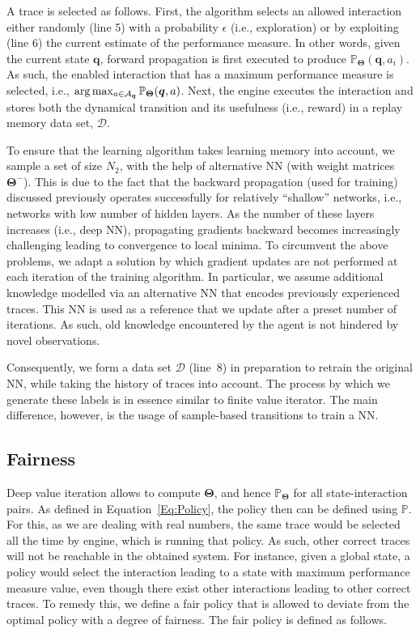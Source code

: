 A trace is selected as follows. First, the algorithm selects an allowed interaction either randomly (line 5) with a probability $\epsilon$ (i.e., exploration) or by exploiting (line 6) the current estimate of the performance measure. In other words, given the current state $ \bm{q}$, forward propagation is first executed to produce  $\mathbb{P}_{\bm{\Theta}}( \bm{q},a_i)$. As such, the enabled interaction that has a maximum performance measure is selected, i.e., $\arg\max_{a\in {\cal A}_{\bm{q}}} \mathbb{P}_{\bm{\Theta}}(\bm{q},a)$. 
Next, the engine executes the interaction and stores both the dynamical transition and its usefulness (i.e., reward) in a replay memory data set, $\mathcal{D}$. 

To ensure that the learning algorithm takes learning memory into account, we sample a set of size $N_{2}$, with the help of alternative NN (with weight matrices $\bm{\Theta}^{-}$). This is due to the fact that the backward propagation (used for training) discussed previously operates successfully for relatively ``shallow'' networks, i.e., networks with low number of hidden layers. As the number of these layers increases (i.e., deep NN), propagating gradients backward becomes increasingly challenging leading to convergence to local minima. To circumvent the above problems, we adapt a solution by which gradient updates are not performed at each iteration of the training algorithm. In particular, we assume additional knowledge modelled via an alternative NN that encodes previously experienced traces. This NN is used as a reference that we update after a preset number of iterations. As such, old knowledge encountered by the agent is not hindered by novel observations. 

Consequently, we form a data set $\mathcal{D}$  (line~8)  in preparation to retrain the original NN, while taking the history of traces into account. The process by which we generate these labels is in essence similar to finite value iterator. The main difference, however, is the usage of sample-based transitions to train a NN.  


\subsection{Fairness}
Deep value iteration allows to compute $\bm{\Theta}$, and hence $\mathbb{P}_{\bm{\Theta}}$ for all state-interaction pairs. As defined in Equation~\ref{Eq:Policy}, the policy then can be defined using $\mathbb{P}$. For this, as we are dealing with real numbers, the same trace would be selected all the time by engine, which is running that policy. As such, other correct traces will not be reachable in the obtained system. For instance, given a global state, a policy would select the interaction leading to a state with maximum performance measure value, even though there exist other interactions leading to other correct traces. To remedy this, we define a fair policy that is allowed to deviate from the optimal policy with a degree of fairness.  The fair policy is defined as follows. 

